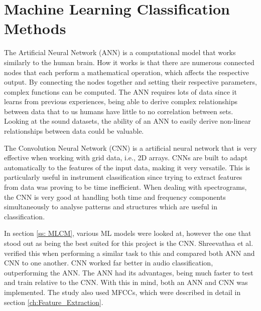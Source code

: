% 
% 
% 
\section{Machine Learning Classification Methods \label{ch:ML_Methods}}
\vspace{0.5cm}

The Artificial Neural Network (ANN) is a computational model that works similarly to the human brain. How it works is that there are numerous connected nodes that each perform a mathematical operation, which affects the respective output. By connecting the nodes together and setting their respective parameters, complex functions can be computed. The ANN requires lots of data since it learns from previous experiences, being able to derive complex relationships between data that to us humans have little to no correlation between sets. Looking at the sound datasets, the ability of an ANN to easily derive non-linear relationships between data could be valuable. 

The Convolution Neural Network (CNN) is a artificial neural network that is very effective when working with grid data, i.e., 2D arrays. CNNs are built to adapt automatically to the features of the input data, making it very versatile. This is particularly useful in instrument classification since trying to extract features from data was proving to be time inefficient. When dealing with spectrograms, the CNN is very good at handling both time and frequency components simultaneously to analyse patterns and structures which are useful in classification. 

In section \ref{ss: MLCM}, various ML models were looked at, however the one that stood out as being the best suited for this project is the CNN. Shreevathsa et al. verified this when performing a similar task to this and compared both ANN and CNN to one another. CNN worked far better in audio classification, outperforming the ANN. The ANN had its advantages, being much faster to test and train relative to the CNN. With this in mind, both an ANN and CNN was implemented. The study also used MFCCs, which were described in detail in section \ref{ch:Feature_Extraction}. 


% 
% 
